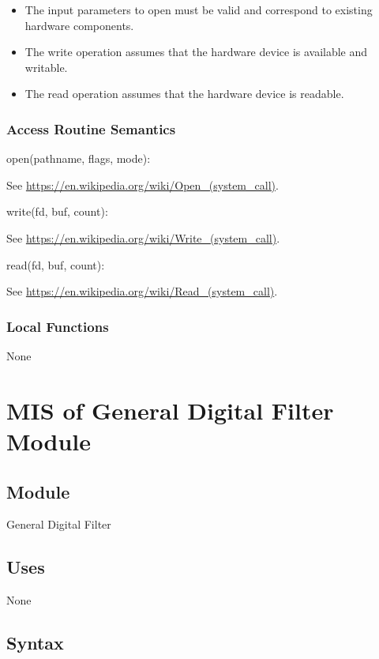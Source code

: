 \documentclass[12pt, titlepage]{article}
\begin{document}
\begin{itemize}
\item The input parameters to open must be valid and correspond to existing
hardware components.
\item The write operation assumes that the hardware device is available and
writable.
\item The read operation assumes that the hardware device is readable.
\end{itemize}

\subsubsection{Access Routine Semantics}

\noindent open(pathname, flags, mode):

See \url{https://en.wikipedia.org/wiki/Open_(system_call)}.

\noindent write(fd, buf, count):

See \url{https://en.wikipedia.org/wiki/Write_(system_call)}.

\noindent read(fd, buf, count):

See \url{https://en.wikipedia.org/wiki/Read_(system_call)}.

\subsubsection{Local Functions}

None

\newpage

\section{MIS of General Digital Filter Module} \label{MIS_GDF}

\subsection{Module}

General Digital Filter

\subsection{Uses}

None

\subsection{Syntax}
\end{document}
